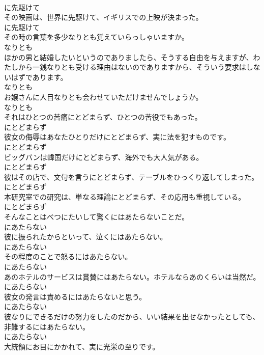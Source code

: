 \documentclass[8pt]{extreport}
\begin{document}
\begin{CJK}{UTF8}{min}
\\	に先駆けて
\\	その映画は、世界に先駆けて、イギリスでの上映が決まった。	
\\	に先駆けて
\\	その時の言葉を多少なりとも覚えていらっしゃいますか。	
\\	なりとも
\\	ほかの男と結婚したいというのでありましたら、そうする自由を与えますが、わたしから一銭なりとも受ける理由はないのでありますから、そういう要求はしないはずであります。	
\\	なりとも
\\	お嬢さんに人目なりとも会わせていただけませんでしょうか。	
\\	なりとも
\\	それはひとつの苦痛にとどまらず、ひとつの苦役でもあった。	
\\	にとどまらず
\\	彼女の侮辱はあなたひとりだけにとどまらず、実に法を犯すものです。	
\\	にとどまらず
\\	ビッグバンは韓国だけにとどまらず、海外でも大人気がある。	
\\	にとどまらず
\\	彼はその店で、文句を言うにとどまらず、テーブルをひっくり返してしまった。	
\\	にとどまらず
\\	本研究室での研究は、単なる理論にとどまらず、その応用も重視している。	
\\	にとどまらず
\\	そんなことはべつにたいして驚くにはあたらないことだ。	
\\	にあたらない
\\	彼に振られたからといって、泣くにはあたらない。	
\\	にあたらない
\\	その程度のことで怒るにはあたらない。	
\\	にあたらない
\\	あのホテルのサービスは賞賛にはあたらない。ホテルならあのくらいは当然だ。	
\\	にあたらない
\\	彼女の発言は責めるにはあたらないと思う。	
\\	にあたらない
\\	彼なりにできるだけの努力をしたのだから、いい結果を出せなかったとしても、非難するにはあたらない。	
\\	にあたらない
\\	大統領にお目にかかれて、実に光栄の至りです。	

\end{CJK}
\end{document}
